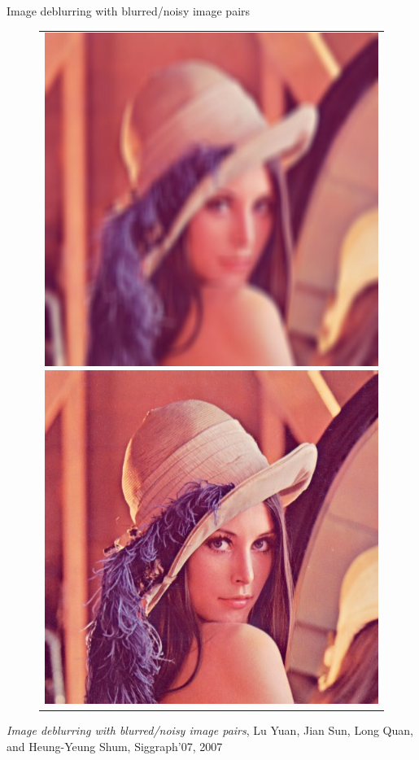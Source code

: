 \documentclass[french]{beamer}
\theoremstyle{plain}
\theoremstyle{remark}
\begin{document}
\begin{frame}{Image deblurring with blurred/noisy image pairs}
\begin{figure}[ht]
\begin{center}
\begin{tabular}{c}
		\includegraphics[scale=0.18]{images/lena_blurred.jpg}
		\includegraphics[scale=0.18]{images/lena.jpg}
	\end{tabular}
\end{center}
\end{figure}
\small
\emph{Image deblurring with blurred/noisy image pairs}, Lu Yuan, Jian Sun, Long Quan, and Heung-Yeung Shum, Siggraph'07, 2007

\end{frame}
\end{document}
